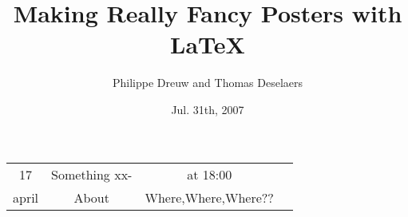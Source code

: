\documentclass[final]{beamer} %
\title[Fancy Posters]{Making Really Fancy Posters with \LaTeX}
\author[Dreuw \& Deselaers]{Philippe Dreuw and Thomas Deselaers}
\institute[RWTH Aachen University]{Human Language Technology and Pattern Recognition,RWTH Aachen University}
\date{Jul. 31th, 2007}
\begin{document}
\begin{frame}{} 
\vfill

 \centering
\begin{tabular}{| c | c | c | c |}
  \hline
  {\LARGE 17 }   & {\Large Something} xx-  & {\normalsize at 18:00}\\
  {\large april} & {\normalsize About} & {\footnotesize Where,Where,Where??}\\
  \hline

\end{tabular}  
\vfill
\end{frame}
\end{document}
